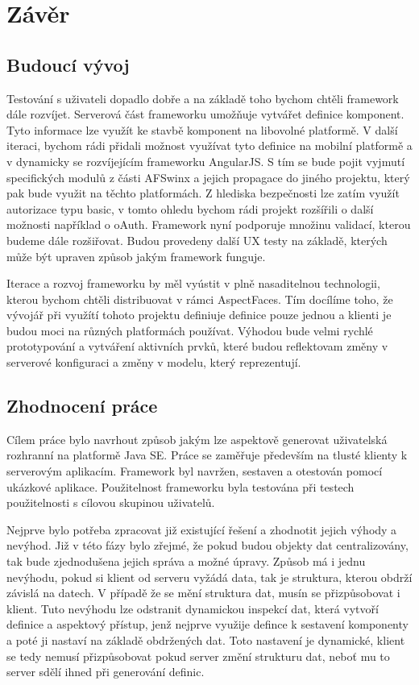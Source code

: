 \chapter{Závěr}
\section{Budoucí vývoj}
Testování s uživateli dopadlo dobře a na základě toho bychom chtěli framework dále rozvíjet.  Serverová část frameworku umožňuje vytvářet definice komponent. Tyto informace lze využít ke stavbě komponent na libovolné platformě. V další iteraci, bychom rádi přidali možnost využívat tyto definice na mobilní platformě a v dynamicky se rozvíjejícím frameworku AngularJS. S tím se bude pojit vyjmutí specifických modulů z části AFSwinx a jejich propagace do jiného projektu, který pak bude využit na těchto platformách. Z hlediska bezpečnosti lze zatím využít autorizace typu basic, v tomto ohledu bychom rádi projekt rozšířili o další možnosti například o oAuth. Framework nyní podporuje množinu validací, kterou budeme dále rozšiřovat. Budou provedeny další UX testy na základě, kterých může být upraven způsob jakým framework funguje.

Iterace a rozvoj frameworku by měl vyústit v plně nasaditelnou technologii, kterou bychom chtěli distribuovat v rámci AspectFaces. Tím docílíme toho, že vývojář při využítí tohoto projektu definiuje definice pouze jednou a klienti je budou moci na různých platformách používat. Výhodou bude velmi rychlé prototypování a vytváření aktivních prvků, které budou reflektovam změny v serverové konfiguraci a změny v modelu, který reprezentují.
\section{Zhodnocení práce}
Cílem práce bylo navrhout způsob jakým lze aspektově generovat uživatelská rozhranní na platformě Java SE. Práce se zaměřuje především na tlusté klienty k serverovým aplikacím. Framework byl navržen, sestaven a otestován pomocí ukázkové aplikace. Použitelnost frameworku byla testována při testech použitelnosti s cílovou skupinou uživatelů.

Nejprve bylo potřeba zpracovat již existující řešení a zhodnotit jejich výhody a nevýhod. Již v této fázy bylo zřejmé, že pokud budou objekty dat centralizovány, tak bude zjednodušena jejich správa a možné úpravy. Způsob má i jednu nevýhodu, pokud si klient od serveru vyžádá data, tak je struktura, kterou obdrží závislá na datech. V případě že se mění struktura dat, musín se přizpůsobovat i klient. Tuto nevýhodu lze odstranit dynamickou inspekcí dat, která vytvoří definice a aspektový přístup, jenž nejprve využije defince k sestavení komponenty a poté ji nastaví na základě obdržených dat. Toto nastavení je dynamické, klient se tedy nemusí přizpůsobovat pokud server změní strukturu dat, neboť mu to server sdělí ihned při generování definic.

